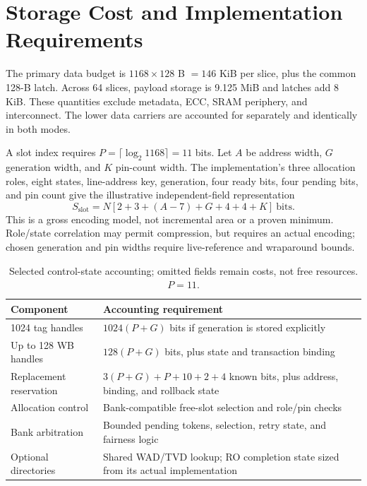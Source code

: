 \documentclass[conference,letterpaper]{IEEEtran}
\begin{document}
\section{Storage Cost and Implementation Requirements}
The primary data budget is $1168\times128$ B $=146$ KiB per slice, plus the common 128-B latch. Across 64 slices, payload storage is 9.125 MiB and latches add 8 KiB. These quantities exclude metadata, ECC, SRAM periphery, and interconnect. The lower data carriers are accounted for separately and identically in both modes.

A slot index requires $P=\lceil\log_2 1168\rceil=11$ bits. Let $A$ be address width, $G$ generation width, and $K$ pin-count width. The implementation's three allocation roles, eight states, line-address key, generation, four ready bits, four pending bits, and pin count give the illustrative independent-field representation
\begin{equation}
 S_{\mathrm{slot}}=N[2+3+(A-7)+G+4+4+K]\ \mathrm{bits}.
\end{equation}
This is a gross encoding model, not incremental area or a proven minimum. Role/state correlation may permit compression, but requires an actual encoding; chosen generation and pin widths require live-reference and wraparound bounds.

\begin{table}[t]
\caption{Selected control-state accounting; omitted fields remain costs, not free resources. $P=11$.}
\label{tab:cost}
\centering\footnotesize
\begin{tabularx}{\columnwidth}{@{}L{.37\columnwidth}X@{}}
\toprule
Component & Accounting requirement \\
 tag handles & $1024(P+G)$ bits if generation is stored explicitly \\
Up to 128 WB handles & $128(P+G)$ bits, plus state and transaction binding \\
Replacement reservation & $3(P+G)+P+10+2+4$ known bits, plus address, binding, and rollback state \\
Allocation control & Bank-compatible free-slot selection and role/pin checks \\
Bank arbitration & Bounded pending tokens, selection, retry state, and fairness logic \\
Optional directories & Shared WAD/TVD lookup; RO completion state sized from its actual implementation \\
\bottomrule
\end{tabularx}
\end{table}
\end{document}
